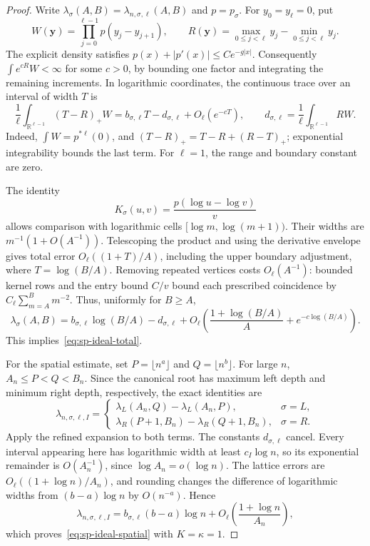 \documentclass[11pt]{article}
\theoremstyle{remark}
\theoremstyle{plain}
\begin{document}
\begin{proof}
Write $\lambda_\sigma(A,B)=\lambda_{n,\sigma,\ell}(A,B)$ and
$p=p_\sigma$.  For $y_0=y_\ell=0$, put
\[
 W(\boldsymbol y)=\prod_{j=0}^{\ell-1}p(y_j-y_{j+1}),
 \qquad
 R(\boldsymbol y)=\max_{0\le j<\ell}y_j-\min_{0\le j<\ell}y_j.
\]
The explicit density satisfies $p(x)+|p'(x)|\le Ce^{-g|x|}$.
Consequently $\int e^{cR}W<\infty$ for some $c>0$, by bounding one
factor and integrating the remaining increments.  In logarithmic
coordinates, the continuous trace over an interval of width $T$ is
\[
 \frac1\ell\int_{\mathbb R^{\ell-1}}(T-R)_+W
 =b_{\sigma,\ell}T-d_{\sigma,\ell}+O_\ell(e^{-cT}),
 \qquad
 d_{\sigma,\ell}=\frac1\ell\int_{\mathbb R^{\ell-1}}RW.
\]
Indeed, $\int W=p^{*\ell}(0)$, and
$(T-R)_+=T-R+(R-T)_+$; exponential integrability bounds the last
term.  For $\ell=1$, the range and boundary constant are zero.

The identity
\[
 K_\sigma(u,v)=\frac{p(\log u-\log v)}{v}
\]
allows comparison with logarithmic cells
$[\log m,\log(m+1))$.  Their widths are
$m^{-1}(1+O(A^{-1}))$.  Telescoping the product and using the derivative
envelope gives total error $O_\ell((1+T)/A)$, including the upper
boundary adjustment, where $T=\log(B/A)$.  Removing repeated vertices
costs $O_\ell(A^{-1})$: bounded kernel rows and the entry bound $C/v$
bound each prescribed coincidence by
$C_\ell\sum_{m=A}^B m^{-2}$.
Thus, uniformly for $B\ge A$,
\[
 \lambda_\sigma(A,B)
 =b_{\sigma,\ell}\log(B/A)-d_{\sigma,\ell}
 +O_\ell\!\left(\frac{1+\log(B/A)}{A}
                  +e^{-c\log(B/A)}\right).
\]
This implies~\eqref{eq:sp-ideal-total}.

For the spatial estimate, set $P=\lfloor n^a\rfloor$ and
$Q=\lfloor n^b\rfloor$.  For large $n$, $A_n\le P<Q<B_n$.
Since the canonical root has maximum left depth and minimum right
depth, respectively, the exact identities are
\[
 \lambda_{n,\sigma,\ell,I}
 =
 \begin{cases}
  \lambda_L(A_n,Q)-\lambda_L(A_n,P),&\sigma=L,\\
  \lambda_R(P+1,B_n)-\lambda_R(Q+1,B_n),&\sigma=R.
 \end{cases}
\]
Apply the refined expansion to both terms.  The constants
$d_{\sigma,\ell}$ cancel.  Every interval appearing here has
logarithmic width at least $c_I\log n$, so its exponential remainder
is $O(A_n^{-1})$, since $\log A_n=o(\log n)$.  The lattice errors are
$O_\ell((1+\log n)/A_n)$, and rounding changes the difference of
logarithmic widths from $(b-a)\log n$ by $O(n^{-a})$.  Hence
\[
 \lambda_{n,\sigma,\ell,I}
 =b_{\sigma,\ell}(b-a)\log n
 +O_\ell\!\left(\frac{1+\log n}{A_n}\right),
\]
which proves~\eqref{eq:sp-ideal-spatial} with $K=\kappa=1$.
\end{proof}
\end{document}

